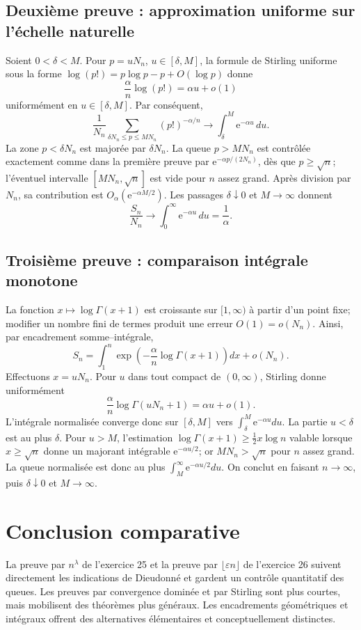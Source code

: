 \documentclass[11pt,a4paper]{article}
\newcommand{\e}{\mathrm e}
\newcommand{\eps}{\varepsilon}
\begin{document}
\subsection{Deuxième preuve : approximation uniforme sur l'échelle naturelle}

\begin{proofbox}
Soient $0<\delta<M$. Pour $p=uN_n$, $u\in[\delta,M]$, la formule de
Stirling uniforme sous la forme $\log(p!)=p\log p-p+O(\log p)$ donne
\[
\frac{\alpha}{n}\log(p!)=\alpha u+o(1)
\]
uniformément en $u\in[\delta,M]$. Par conséquent,
\[
\frac1{N_n}\sum_{\delta N_n\leq p\leq MN_n}(p!)^{-\alpha/n}
\to\int_\delta^M\e^{-\alpha u}\,du.
\]
La zone $p<\delta N_n$ est majorée par $\delta N_n$. La queue $p>MN_n$
est contrôlée exactement comme dans la première preuve par
$\e^{-\alpha p/(2N_n)}$, dès que $p\geq\sqrt n$; l'éventuel intervalle
$[MN_n,\sqrt n]$ est vide pour $n$ assez grand. Après division par $N_n$,
sa contribution est $O_\alpha(\e^{-\alpha M/2})$. Les passages
$\delta\downarrow0$ et $M\to\infty$ donnent
\[
\frac{S_n}{N_n}\to\int_0^\infty\e^{-\alpha u}\,du=\frac1\alpha.
\]
\end{proofbox}

\subsection{Troisième preuve : comparaison intégrale monotone}

\begin{proofbox}
La fonction $x\mapsto\log\Gamma(x+1)$ est croissante sur $[1,\infty)$ à
partir d'un point fixe; modifier un nombre fini de termes produit une erreur
$O(1)=o(N_n)$. Ainsi, par encadrement somme--intégrale,
\[
S_n=\int_1^n\exp\left(-\frac{\alpha}{n}\log\Gamma(x+1)\right)dx+o(N_n).
\]
Effectuons $x=uN_n$. Pour $u$ dans tout compact de $(0,\infty)$, Stirling
donne uniformément
\[
\frac{\alpha}{n}\log\Gamma(uN_n+1)=\alpha u+o(1).
\]
L'intégrale normalisée converge donc sur $[\delta,M]$ vers
$\int_\delta^M\e^{-\alpha u}du$. La partie $u<\delta$ est au plus $\delta$.
Pour $u>M$, l'estimation
$\log\Gamma(x+1)\geq\frac12x\log n$ valable lorsque
$x\geq\sqrt n$ donne un majorant intégrable $\e^{-\alpha u/2}$; or
$MN_n>\sqrt n$ pour $n$ assez grand. La queue normalisée est donc au plus
$\int_M^\infty\e^{-\alpha u/2}du$. On conclut en faisant
$n\to\infty$, puis $\delta\downarrow0$ et $M\to\infty$.
\end{proofbox}

\section{Conclusion comparative}

\begin{propositionbox}[title=Choix des méthodes]
La preuve par $n^\lambda$ de l'exercice 25 et la preuve par
$\lfloor\eps n\rfloor$ de l'exercice 26 suivent directement les indications
de Dieudonné et gardent un contrôle quantitatif des queues. Les preuves par
convergence dominée et par Stirling sont plus courtes, mais mobilisent des
théorèmes plus généraux. Les encadrements géométriques et intégraux offrent
des alternatives élémentaires et conceptuellement distinctes.
\end{propositionbox}
\end{document}
